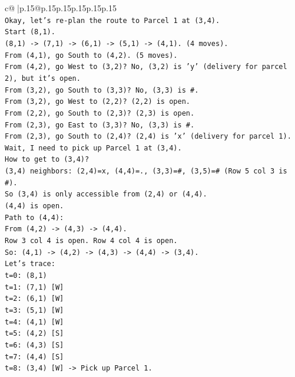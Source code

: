 \documentclass{article}
\begin{document}
{\begin{supertabular}{c@{$\;$}|p{.15\linewidth}@{}p{.15\linewidth}p{.15\linewidth}p{.15\linewidth}p{.15\linewidth}p{.15\linewidth}}
{{{\\ 
\texttt{Okay, let's re{-}plan the route to Parcel 1 at (3,4).} \\
\texttt{Start (8,1).} \\
\texttt{(8,1) {-}> (7,1) {-}> (6,1) {-}> (5,1) {-}> (4,1). (4 moves).} \\
\texttt{From (4,1), go South to (4,2). (5 moves).} \\
\texttt{From (4,2), go West to (3,2)? No, (3,2) is 'y' (delivery for parcel 2), but it's open.} \\
\texttt{From (3,2), go South to (3,3)? No, (3,3) is \#.} \\
\texttt{From (3,2), go West to (2,2)? (2,2) is open.} \\
\texttt{From (2,2), go South to (2,3)? (2,3) is open.} \\
\texttt{From (2,3), go East to (3,3)? No, (3,3) is \#.} \\
\texttt{From (2,3), go South to (2,4)? (2,4) is 'x' (delivery for parcel 1).} \\
\texttt{Wait, I need to pick up Parcel 1 at (3,4).} \\
\texttt{How to get to (3,4)?} \\
\texttt{(3,4) neighbors: (2,4)=x, (4,4)=., (3,3)=\#, (3,5)=\# (Row 5 col 3 is \#).} \\
\texttt{So (3,4) is only accessible from (2,4) or (4,4).} \\
\texttt{(4,4) is open.} \\
\texttt{Path to (4,4):} \\
\texttt{From (4,2) {-}> (4,3) {-}> (4,4).} \\
\texttt{Row 3 col 4 is open. Row 4 col 4 is open.} \\
\texttt{So: (4,1) {-}> (4,2) {-}> (4,3) {-}> (4,4) {-}> (3,4).} \\
\texttt{Let's trace:} \\
\texttt{t=0: (8,1)} \\
\texttt{t=1: (7,1) {[}W{]}} \\
\texttt{t=2: (6,1) {[}W{]}} \\
\texttt{t=3: (5,1) {[}W{]}} \\
\texttt{t=4: (4,1) {[}W{]}} \\
\texttt{t=5: (4,2) {[}S{]}} \\
\texttt{t=6: (4,3) {[}S{]}} \\
\texttt{t=7: (4,4) {[}S{]}} \\
\texttt{t=8: (3,4) {[}W{]} {-}> Pick up Parcel 1.} \\
}}}
\end{supertabular}}
\end{document}
